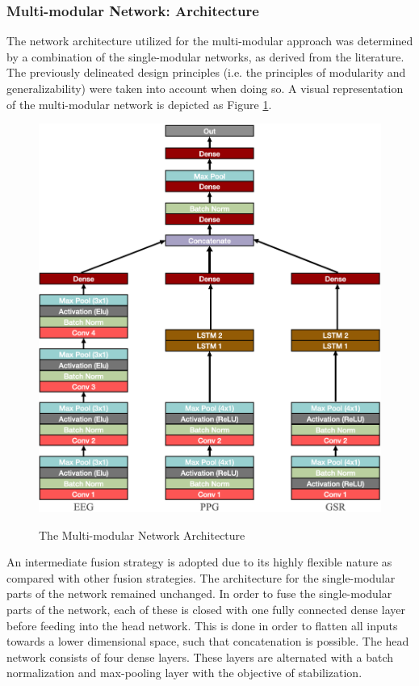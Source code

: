 \documentclass[12pt]{article}
\begin{document}
\subsubsection{Multi-modular Network: Architecture}
The network architecture utilized for the multi-modular approach was determined by a combination of the single-modular networks, as derived from the literature. The previously delineated design principles (i.e. the principles of modularity and generalizability) were taken into account when doing so. A visual representation of the multi-modular network is depicted as Figure \ref{fig:multiarchitecture}.

\begin{figure}
\caption{The Multi-modular Network Architecture}
\bigskip
\includegraphics[scale=0.725]{multi_model_architecture}
\label{fig:multiarchitecture}
\end{figure}

An intermediate fusion strategy is adopted due to its highly flexible nature as compared with other fusion strategies. The architecture for the single-modular parts of the network remained unchanged. In order to fuse the  single-modular parts of the network, each of these is closed with one fully connected dense layer before feeding into the head network. This is done in order to flatten all inputs towards a lower dimensional space, such that concatenation is possible. The head network consists of four dense layers. These layers are alternated with a batch normalization and max-pooling layer with the objective of stabilization. 
\end{document}
